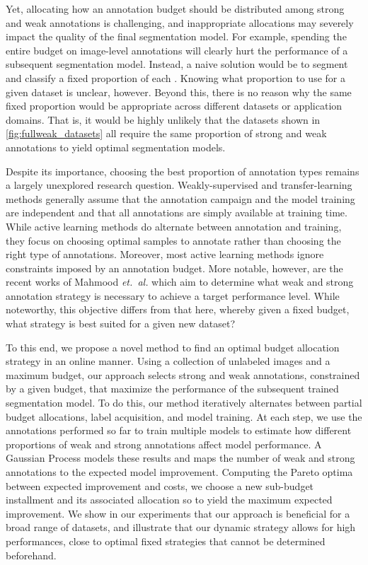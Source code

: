 Yet, allocating how an annotation budget should be distributed among strong and weak annotations is challenging, and inappropriate allocations may severely impact the quality of the final segmentation model. For example, spending the entire budget on image-level annotations will clearly hurt the performance of a subsequent segmentation model. Instead, a naive solution would be to segment and classify a fixed proportion of each . Knowing what proportion to use for a given dataset is unclear, however. Beyond this, there is no reason why the same fixed proportion would be appropriate across different datasets or application domains. That is, it would be highly unlikely that the datasets shown in \cref{fig:fullweak_datasets} all require the same proportion of strong and weak annotations to yield optimal segmentation models.

Despite its importance, choosing the best proportion of annotation types remains a largely unexplored research question. Weakly-supervised and transfer-learning methods generally assume that the annotation campaign and the model training are independent and that all annotations are simply available at training time. While active learning methods do alternate between annotation and training, they focus on choosing optimal samples to annotate rather than choosing the right type of annotations. Moreover, most active learning methods ignore constraints imposed by an annotation budget. More notable, however, are the recent works of Mahmood {\it et.~al.} which aim to determine what weak and strong annotation strategy is necessary to achieve a target performance level. While noteworthy, this objective differs from that here, whereby given a fixed budget, what strategy is best suited for a given new dataset?

To this end, we propose a novel method to find an optimal budget allocation strategy in an online manner. Using a collection of unlabeled images and a maximum budget, our approach selects strong and weak annotations, constrained by a given budget, that maximize the performance of the subsequent trained segmentation model. To do this, our method iteratively alternates between partial budget allocations, label acquisition, and model training. At each step, we use the annotations performed so far to train multiple models to estimate how different proportions of weak and strong annotations affect model performance. A Gaussian Process models these results and maps the number of weak and strong annotations to the expected model improvement. Computing the Pareto optima between expected improvement and costs, we choose a new sub-budget installment and its associated allocation so to yield the maximum expected improvement. We show in our experiments that our approach is beneficial for a broad range of datasets, and illustrate that our dynamic strategy allows for high performances, close to optimal fixed strategies that cannot be determined beforehand.
